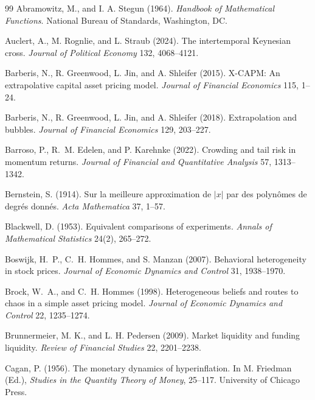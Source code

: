\documentclass[12pt]{article}
\theoremstyle{definition}
\theoremstyle{remark}
\begin{document}
\begin{thebibliography}{99}\setlength{\itemsep}{2pt}\small
{} Abramowitz, M., and I. A. Stegun (1964). \emph{Handbook of Mathematical Functions}. National Bureau of Standards, Washington, DC.

 Auclert, A., M. Rognlie, and L. Straub (2024). The intertemporal Keynesian cross. \emph{Journal of Political Economy} 132, 4068--4121.

 Barberis, N., R. Greenwood, L. Jin, and A. Shleifer (2015). X-CAPM: An extrapolative capital asset pricing model. \emph{Journal of Financial Economics} 115, 1--24.

 Barberis, N., R. Greenwood, L. Jin, and A. Shleifer (2018). Extrapolation and bubbles. \emph{Journal of Financial Economics} 129, 203--227.

 Barroso, P., R.~M. Edelen, and P. Karehnke (2022). Crowding and tail risk in momentum returns. \emph{Journal of Financial and Quantitative Analysis} 57, 1313--1342.

 Bernstein, S. (1914). Sur la meilleure approximation de $|x|$ par des polyn\^omes de degr\'es donn\'es. \emph{Acta Mathematica} 37, 1--57.

 Blackwell, D. (1953). Equivalent comparisons of experiments. \emph{Annals of Mathematical Statistics} 24(2), 265--272.

 Boswijk, H.~P., C.~H. Hommes, and S. Manzan (2007). Behavioral heterogeneity in stock prices. \emph{Journal of Economic Dynamics and Control} 31, 1938--1970.

 Brock, W.~A., and C.~H. Hommes (1998). Heterogeneous beliefs and routes to chaos in a simple asset pricing model. \emph{Journal of Economic Dynamics and Control} 22, 1235--1274.

 Brunnermeier, M. K., and L. H. Pedersen (2009). Market liquidity and funding liquidity. \emph{Review of Financial Studies} 22, 2201--2238.

 Cagan, P. (1956). The monetary dynamics of hyperinflation. In M. Friedman (Ed.), \emph{Studies in the Quantity Theory of Money}, 25--117. University of Chicago Press.


\end{thebibliography}
\end{document}

